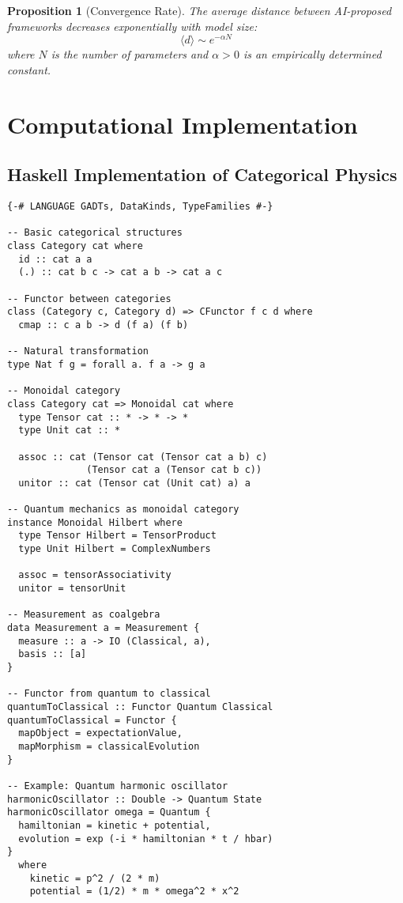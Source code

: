\documentclass[11pt,a4paper]{article}
\newtheorem{proposition}[theorem]{Proposition}
\begin{document}
\begin{proposition}[Convergence Rate]
The average distance between AI-proposed frameworks decreases exponentially with model size:
\[
\langle d \rangle \sim e^{-\alpha N}
\]
where $N$ is the number of parameters and $\alpha > 0$ is an empirically determined constant.
\end{proposition}

\section{Computational Implementation}

\subsection{Haskell Implementation of Categorical Physics}

\begin{lstlisting}
{-# LANGUAGE GADTs, DataKinds, TypeFamilies #-}

-- Basic categorical structures
class Category cat where
  id :: cat a a
  (.) :: cat b c -> cat a b -> cat a c

-- Functor between categories  
class (Category c, Category d) => CFunctor f c d where
  cmap :: c a b -> d (f a) (f b)

-- Natural transformation
type Nat f g = forall a. f a -> g a

-- Monoidal category
class Category cat => Monoidal cat where
  type Tensor cat :: * -> * -> *
  type Unit cat :: *
  
  assoc :: cat (Tensor cat (Tensor cat a b) c) 
              (Tensor cat a (Tensor cat b c))
  unitor :: cat (Tensor cat (Unit cat) a) a

-- Quantum mechanics as monoidal category
instance Monoidal Hilbert where
  type Tensor Hilbert = TensorProduct
  type Unit Hilbert = ComplexNumbers
  
  assoc = tensorAssociativity
  unitor = tensorUnit

-- Measurement as coalgebra
data Measurement a = Measurement {
  measure :: a -> IO (Classical, a),
  basis :: [a]
}

-- Functor from quantum to classical
quantumToClassical :: Functor Quantum Classical
quantumToClassical = Functor {
  mapObject = expectationValue,
  mapMorphism = classicalEvolution
}

-- Example: Quantum harmonic oscillator
harmonicOscillator :: Double -> Quantum State
harmonicOscillator omega = Quantum {
  hamiltonian = kinetic + potential,
  evolution = exp (-i * hamiltonian * t / hbar)
}
  where
    kinetic = p^2 / (2 * m)
    potential = (1/2) * m * omega^2 * x^2
\end{lstlisting}
\end{document}
